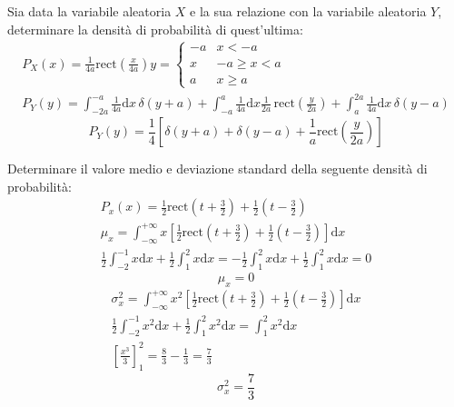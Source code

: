 \documentclass{article}
\newcommand{\rect}{\mathrm{rect}}
\newcommand{\df}{\mathrm{d}}
\begin{document}
Sia data la variabile aleatoria $X$ e la sua relazione con la variabile aleatoria $Y$, determinare la densità di probabilità di quest'ultima:
\begin{gather*}
    P_X(x)=\frac{1}{4a}\rect\left(\frac{x}{4a}\right)
    y=\begin{cases}
        -a&x<-a\\
        x&-a\geq x<a\\
        a&x\geq a
    \end{cases}\\
    P_Y(y)=\displaystyle\int_{-2a}^{-a}\frac{1}{4a}\df x\,\delta(y+a)+\int_{-a}^a\frac{1}{4a}\df x\frac{1}{2a}\,\rect\left(\frac{y}{2a}\right)+\int_{a}^{2a}\frac{1}{4a}\df x\,\delta(y-a)
\end{gather*}
\begin{equation}
    P_Y(y)=\displaystyle\frac{1}{4}\left[\delta(y+a)+\delta(y-a)+\frac{1}{a}\rect\left(\frac{y}{2a}\right)\right]
\end{equation}

Determinare il valore medio e deviazione standard della seguente densità di probabilità:
\begin{gather*}
    P_x(x)=\displaystyle\frac{1}{2}\rect\left({t+\frac{3}{2}}\right)+\frac{1}{2}\left({t-\frac{3}{2}}\right)\\
    \mu_x=\displaystyle\int_{-\infty}^{+\infty}x\left[\frac{1}{2}\rect\left({t+\frac{3}{2}}\right)+\frac{1}{2}\left({t-\frac{3}{2}}\right)\right]\df x\\
    \displaystyle\frac{1}{2}\int_{-2}^{-1}x\df x+\frac{1}{2}\int_{1}^2x\df x=-\frac{1}{2}\int_1^2x\df x+\frac{1}{2}\int_1^2x\df x=0
\end{gather*}
\begin{equation}
    \mu_x=0
\end{equation}
\begin{gather*}
    \sigma_x^2=\displaystyle\int_{-\infty}^{+\infty}x^2\left[\frac{1}{2}\rect\left({t+\frac{3}{2}}\right)+\frac{1}{2}\left({t-\frac{3}{2}}\right)\right]\df x\\
    \displaystyle\frac{1}{2}\int_{-2}^{-1}x^2\df x+\frac{1}{2}\int_1^2x^2\df x=\int_1^2x^2\df x\\
    \displaystyle\left[\frac{x^3}{3}\right]_1^2=\frac{8}{3}-\frac{1}{3}=\frac{7}{3}
\end{gather*}
\begin{equation}
    \sigma_x^2=\displaystyle\frac{7}{3}
\end{equation}
\end{document}
